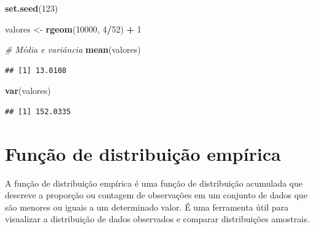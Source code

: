 \documentclass[
]{book}
\newenvironment{Shaded}{\begin{snugshade}}{\end{snugshade}}
\newcommand{\CommentTok}[1]{\textcolor[rgb]{0.56,0.35,0.01}{\textit{#1}}}
\newcommand{\DecValTok}[1]{\textcolor[rgb]{0.00,0.00,0.81}{#1}}
\newcommand{\FunctionTok}[1]{\textcolor[rgb]{0.13,0.29,0.53}{\textbf{#1}}}
\newcommand{\NormalTok}[1]{#1}
\newcommand{\OtherTok}[1]{\textcolor[rgb]{0.56,0.35,0.01}{#1}}
\newcommand{\SpecialCharTok}[1]{\textcolor[rgb]{0.81,0.36,0.00}{\textbf{#1}}}
\begin{document}
\begin{Shaded}
\begin{Highlighting}[]
\FunctionTok{set.seed}\NormalTok{(}\DecValTok{123}\NormalTok{)}

\NormalTok{valores }\OtherTok{\textless{}{-}} \FunctionTok{rgeom}\NormalTok{(}\DecValTok{10000}\NormalTok{, }\DecValTok{4}\SpecialCharTok{/}\DecValTok{52}\NormalTok{) }\SpecialCharTok{+} \DecValTok{1}

\CommentTok{\# Média e variância}
\FunctionTok{mean}\NormalTok{(valores)}
\end{Highlighting}
\end{Shaded}

\begin{verbatim}
## [1] 13.0108
\end{verbatim}

\begin{Shaded}
\begin{Highlighting}[]
\FunctionTok{var}\NormalTok{(valores)}
\end{Highlighting}
\end{Shaded}

\begin{verbatim}
## [1] 152.0335
\end{verbatim}

\section{Função de distribuição empírica}\label{funuxe7uxe3o-de-distribuiuxe7uxe3o-empuxedrica}

A função de distribuição empírica é uma função de distribuição acumulada
que descreve a proporção ou contagem de observações em um conjunto de
dados que são menores ou iguais a um determinado valor. É uma ferramenta
útil para visualizar a distribuição de dados observados e comparar
distribuições amostrais.
\end{document}
